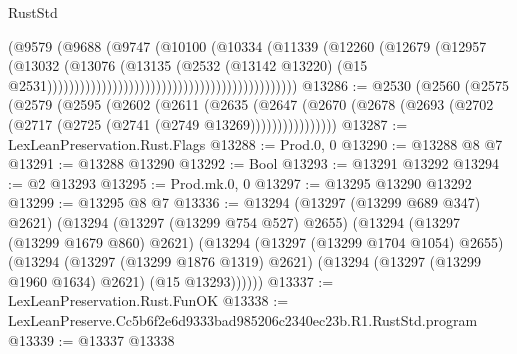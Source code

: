 \begin{lexlean}{RustStd}
\begin{coremodule}
                                                                    (@9579
                                                                      (@9688
                                                                        (@9747
                                                                          (@10100
                                                                            (@10334
                                                                              (@11339
                                                                                (@12260
                                                                                  (@12679
                                                                                    (@12957
                                                                                      (@13032
                                                                                        (@13076
                                                                                          (@13135
                                                                                            (@2532
                                                                                              (@13142
                                                                                                @13220)
                                                                                              (@15
                                                                                                @2531))))))))))))))))))))))))))))))))))))))))))))))
@13286 := @2530
    (@2560
      (@2575
        (@2579
          (@2595
            (@2602
              (@2611
                (@2635
                  (@2647
                    (@2670 (@2678 (@2693 (@2702 (@2717 (@2725 (@2741 (@2749 @13269))))))))))))))))
@13287 := LexLeanPreservation.Rust.Flags
@13288 := Prod.{0, 0}
@13290 := @13288 @8 @7
@13291 := @13288 @13290
@13292 := Bool
@13293 := @13291 @13292
@13294 := @2 @13293
@13295 := Prod.mk.{0, 0}
@13297 := @13295 @13290 @13292
@13299 := @13295 @8 @7
@13336 := @13294
    (@13297 (@13299 @689 @347) @2621)
    (@13294
      (@13297 (@13299 @754 @527) @2655)
      (@13294
        (@13297 (@13299 @1679 @860) @2621)
        (@13294
          (@13297 (@13299 @1704 @1054) @2655)
          (@13294
            (@13297 (@13299 @1876 @1319) @2621)
            (@13294 (@13297 (@13299 @1960 @1634) @2621) (@15 @13293))))))
@13337 := LexLeanPreservation.Rust.FunOK
@13338 := LexLeanPreserve.Cc5b6f2e6d9333bad985206c2340ec23b.R1.RustStd.program
@13339 := @13337 @13338

\end{coremodule}
\end{lexlean}
